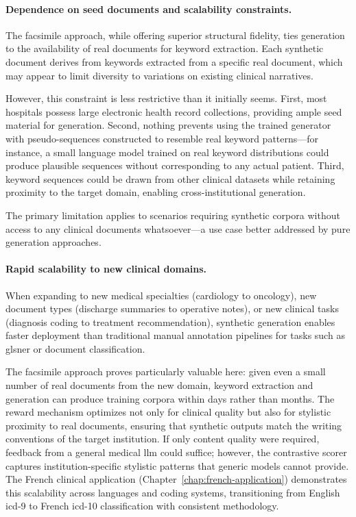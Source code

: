 \paragraph{Dependence on seed documents and scalability constraints.}

The facsimile approach, while offering superior structural fidelity, ties generation to the availability of real documents for keyword extraction.
Each synthetic document derives from keywords extracted from a specific real document, which may appear to limit diversity to variations on existing clinical narratives.

However, this constraint is less restrictive than it initially seems.
First, most hospitals possess large electronic health record collections, providing ample seed material for generation.
Second, nothing prevents using the trained generator with pseudo-sequences constructed to resemble real keyword patterns—for instance, a small language model trained on real keyword distributions could produce plausible sequences without corresponding to any actual patient.
Third, keyword sequences could be drawn from other clinical datasets while retaining proximity to the target domain, enabling cross-institutional generation.

The primary limitation applies to scenarios requiring synthetic corpora without access to any clinical documents whatsoever—a use case better addressed by pure generation approaches.

\paragraph{Rapid scalability to new clinical domains.}

When expanding to new medical specialties (cardiology to oncology), new document types (discharge summaries to operative notes), or new clinical tasks (diagnosis coding to treatment recommendation), synthetic generation enables faster deployment than traditional manual annotation pipelines for tasks such as gls{ner} or document classification.

The facsimile approach proves particularly valuable here: given even a small number of real documents from the new domain, keyword extraction and generation can produce training corpora within days rather than months.
The reward mechanism optimizes not only for clinical quality but also for stylistic proximity to real documents, ensuring that synthetic outputs match the writing conventions of the target institution.
If only content quality were required, feedback from a general medical \gls{llm} could suffice; however, the contrastive scorer captures institution-specific stylistic patterns that generic models cannot provide.
The French clinical application (Chapter~\ref{chap:french-application}) demonstrates this scalability across languages and coding systems, transitioning from English \gls{icd}-9 to French \gls{icd}-10 classification with consistent methodology.

